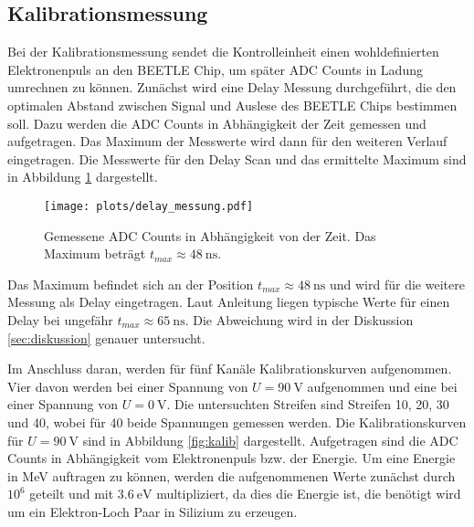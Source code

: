 \subsection{Kalibrationsmessung}
\label{sec:kalibration}

Bei der Kalibrationsmessung sendet die Kontrolleinheit einen wohldefinierten 
Elektronenpuls an den BEETLE Chip, um später ADC Counts in Ladung umrechnen 
zu können.
Zunächst wird eine Delay Messung durchgeführt, die den optimalen Abstand zwischen
Signal und Auslese des BEETLE Chips bestimmen soll. Dazu werden die ADC Counts 
in Abhängigkeit der Zeit gemessen und aufgetragen. Das Maximum der Messwerte wird 
dann für den weiteren Verlauf eingetragen. Die Messwerte für den Delay 
Scan und das ermittelte Maximum sind in Abbildung \ref{fig:delay} 
dargestellt.

\begin{figure}[H]
  \centering
  \texttt{[image: plots/delay\_messung.pdf]}
  \caption{Gemessene ADC Counts in Abhängigkeit von der Zeit. Das 
  Maximum beträgt $t_{max} \approx \SI{48}{\nano\second}$.}
  \label{fig:delay}
\end{figure}

Das Maximum befindet sich an der Position $t_{max} \approx \SI{48}{\nano\second}$
und wird für die weitere Messung als Delay eingetragen. Laut Anleitung 
\cite{Anleitung} liegen typische Werte für einen Delay bei 
ungefähr $t_{max} \approx \SI{65}{\nano\second}$. Die Abweichung wird 
in der Diskussion \ref{sec:diskussion} genauer untersucht. \par \smallskip

Im Anschluss daran, werden für fünf Kanäle Kalibrationskurven aufgenommen. Vier 
davon werden bei einer Spannung von $U = \SI{90}{\volt}$ aufgenommen und eine 
bei einer Spannung von $U = \SI{0}{\volt}$. Die untersuchten Streifen sind 
Streifen 10, 20, 30 und 40, wobei für 40 beide Spannungen gemessen werden. 
Die Kalibrationskurven für $U = \SI{90}{\volt}$ 
sind in Abbildung \ref{fig:kalib} dargestellt. Aufgetragen sind die ADC Counts 
in Abhängigkeit vom Elektronenpuls bzw. der Energie. Um eine Energie in MeV 
auftragen zu können, werden die aufgenommenen Werte zunächst durch $10^6$ geteilt 
und mit $\SI{3.6}{\electronvolt}$ multipliziert, da dies die Energie ist, die benötigt 
wird um ein Elektron-Loch Paar in Silizium zu erzeugen.

